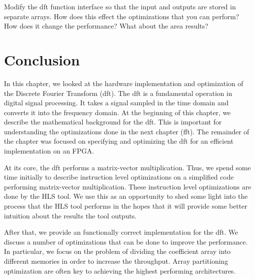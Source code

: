 \begin{exercise}
Modify the \gls{dft} function interface so that the input and outputs are stored in separate arrays. How does this effect the optimizations that you can perform? How does it change the performance? What about the area results?
\end{exercise}



\section{Conclusion}
In this chapter, we looked at the hardware implementation and optimization of the Discrete Fourier Transform (\gls{dft}). The \gls{dft} is a fundamental operation in digital signal processing. It takes a signal sampled in the time domain and converts it into the frequency domain. At the beginning of this chapter, we describe the mathematical background for the \gls{dft}. This is important for understanding the optimizations done in the next chapter (\gls{fft}). The remainder of the chapter was focused on specifying and optimizing the \gls{dft} for an efficient implementation on an FPGA.  

At its core, the \gls{dft} performs a matrix-vector multiplication. Thus, we spend some time initially to describe instruction level optimizations on a simplified code performing matrix-vector multiplication. These instruction level optimizations are done by the HLS tool. We use this as an opportunity to shed some light into the process that the HLS tool performs in the hopes that it will provide some better intuition about the results the tool outputs.

After that, we provide an functionally correct implementation for the \gls{dft}. We discuss a number of optimizations that can be done to improve the performance. In particular, we focus on the problem of dividing the coefficient array into different memories in order to increase the throughput. Array partitioning optimization are often key to achieving the highest performing architectures. 

